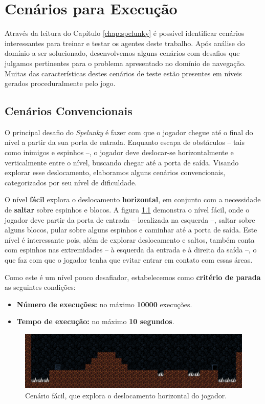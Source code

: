 \chapter{\label{chap:scenarios}Cenários para Execução}
Através da leitura do Capítulo \ref{chap:spelunky} é possível identificar
cenários interessantes para treinar e testar os agentes deste trabalho. Após
análise do domínio a ser solucionado, desenvolvemos alguns cenários com desafios
que julgamos pertinentes para o problema apresentado no domínio de navegação.
Muitas das características destes cenários de teste estão presentes em níveis
gerados proceduralmente pelo jogo.

\section{\label{section:scenarios-conventional}Cenários Convencionais}

O principal desafio do \textit{Spelunky} é fazer com que o jogador chegue até
o final do nível a partir da sua porta de entrada. Enquanto escapa de
obstáculos -- tais como inimigos e espinhos --, o jogador deve deslocar-se
horizontalmente e verticalmente entre o nível, buscando chegar até a porta de
saída. Visando explorar esse deslocamento, elaboramos alguns cenários
convencionais, categorizados por seu nível de dificuldade.

O nível \textbf{fácil} explora o deslocamento \textbf{horizontal}, em conjunto
com a necessidade de \textbf{saltar} sobre espinhos e blocos. A figura
\ref{fig:level1} demonstra o nível fácil, onde o jogador deve partir da porta de
entrada -- localizada na esquerda --, saltar sobre alguns blocos, pular sobre
alguns espinhos e caminhar até a porta de saída. Este nível é interessante pois,
além de explorar deslocamento e saltos, também conta com espinhos nas
extremidades -- à esquerda da entrada e à direita da saída --, o que faz com que
o jogador tenha que evitar entrar em contato com essas áreas.

Como este é um nível pouco desafiador, estabelecemos como \textbf{critério de
parada} as seguintes condições:

\begin{itemize}
	\item \textbf{Número de execuções:} no máximo \textbf{10000} execuções.
	\item \textbf{Tempo de execução:} no máximo \textbf{10 segundos}.
\end{itemize}

\begin{figure}[H]
\centering
\includegraphics[width=\textwidth]{fig/levels/level1.pdf}
\caption{Cenário fácil, que explora o deslocamento horizontal do jogador.}
\label{fig:level1}
\end{figure}

